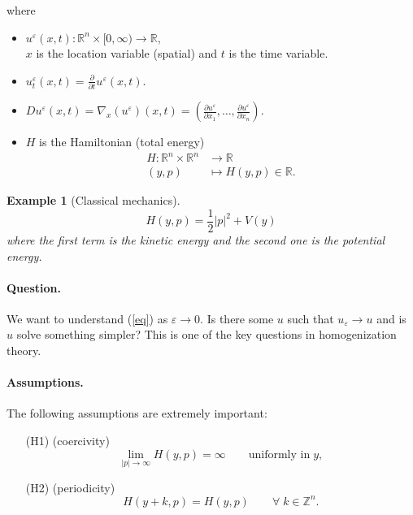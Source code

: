 \documentclass[12pt, oneside]{amsart}  	%
\newtheorem{example}{Example}
\begin{document}
where

\begin{itemize}
\item $u^\varepsilon(x,t): \mathbb{R}^n\times[0,\infty)\longrightarrow\mathbb{R}$,\\ $x$ is the location variable (spatial) and $t$ is the time variable.
\item $u_t^\varepsilon(x,t) = \frac{\partial}{\partial t}u^\varepsilon(x,t)$.
\item $Du^\varepsilon(x,t) = \nabla_x(u^\varepsilon)(x,t) = \left(\frac{\partial u^\varepsilon}{\partial x_1},\ldots, \frac{\partial u^\varepsilon}{\partial x_n}\right)$.
\item $H$ is the Hamiltonian (total energy)
\begin{align*}
H: \mathbb{R}^n\times \mathbb{R}^n &\longrightarrow \mathbb{R}\\
(y,p)&\longmapsto H(y,p) \in \mathbb{R}.
\end{align*}
\end{itemize}


\begin{example}[Classical mechanics]
\begin{equation*}
H(y,p) = \frac{1}{2}|p|^2 + V(y)
\end{equation*}
where the first term is the kinetic energy and the second one is the potential energy.
\end{example}

\paragraph{\textbf{Question.}}
We want to understand (\ref{eq}) as $\varepsilon\longrightarrow 0$. Is there some $u$ such that $u_\varepsilon\longrightarrow u$ and is $u$ solve something simpler? This is one of the key questions in homogenization theory.\\



\paragraph{\textbf{Assumptions.}} The following assumptions are extremely important:
\begin{itemize}
\item[(H1)] (coercivity) 
\begin{equation*}
\lim_{|p|\longrightarrow\infty} H(y,p) = \infty \qquad\text{uniformly in}\;y,
\end{equation*}
\item[(H2)] (periodicity) 
\begin{equation*}
H(y+k,p) = H(y,p) \qquad\forall\;k\in \mathbb{Z}^n.
\end{equation*}
\end{itemize}
\end{document}
